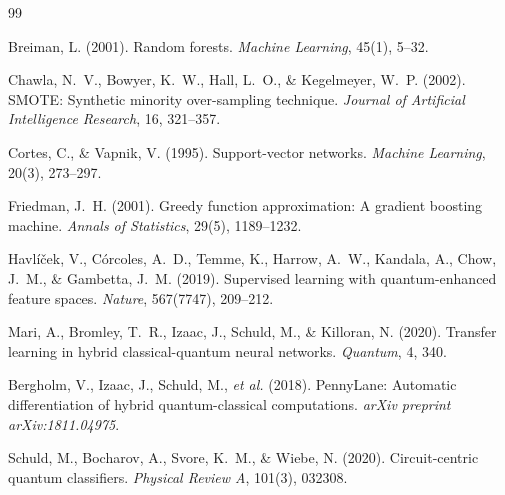 \documentclass[12pt, a4paper]{article}
\begin{document}

\begin{thebibliography}{99}

Breiman, L. (2001).
\newblock Random forests.
\newblock \textit{Machine Learning}, 45(1), 5--32.

Chawla, N.~V., Bowyer, K.~W., Hall, L.~O., \& Kegelmeyer, W.~P. (2002).
\newblock SMOTE: Synthetic minority over-sampling technique.
\newblock \textit{Journal of Artificial Intelligence Research}, 16, 321--357.

Cortes, C., \& Vapnik, V. (1995).
\newblock Support-vector networks.
\newblock \textit{Machine Learning}, 20(3), 273--297.

Friedman, J.~H. (2001).
\newblock Greedy function approximation: A gradient boosting machine.
\newblock \textit{Annals of Statistics}, 29(5), 1189--1232.

Havl{\'i}{\v{c}}ek, V., C{\'o}rcoles, A.~D., Temme, K., Harrow, A.~W.,
Kandala, A., Chow, J.~M., \& Gambetta, J.~M. (2019).
\newblock Supervised learning with quantum-enhanced feature spaces.
\newblock \textit{Nature}, 567(7747), 209--212.

Mari, A., Bromley, T.~R., Izaac, J., Schuld, M., \& Killoran, N. (2020).
\newblock Transfer learning in hybrid classical-quantum neural networks.
\newblock \textit{Quantum}, 4, 340.

Bergholm, V., Izaac, J., Schuld, M., \textit{et al.} (2018).
\newblock PennyLane: Automatic differentiation of hybrid quantum-classical computations.
\newblock \textit{arXiv preprint arXiv:1811.04975}.

Schuld, M., Bocharov, A., Svore, K.~M., \& Wiebe, N. (2020).
\newblock Circuit-centric quantum classifiers.
\newblock \textit{Physical Review A}, 101(3), 032308.

\end{thebibliography}
\end{document}
